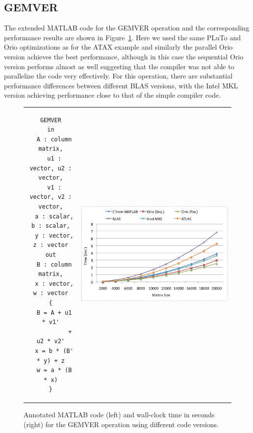 \documentclass[runningheads]{llncs}
\begin{document}
\subsection{GEMVER}


The extended MATLAB code for the GEMVER operation and the corresponding performance results are shown in Figure~\ref{fig:gemver}. Here we used the same PLuTo and Orio optimizations as for the ATAX example and similarly the parallel Orio version achieves the best performance, although in this case the sequential Orio version performs almost as well suggesting that the compiler was not able to parallelize the code very effectively. For this operation, there are substantial performance differences between different BLAS versions, with the Intel MKL version achieving performance close to that of the simple compiler code.
\begin{figure}[htp]
\centering
\begin{tabular}{cc}
\begin{minipage}[b]{.3\textwidth}
\footnotesize
\begin{verbatim}
GEMVER
in
  A : column matrix,
  u1 : vector, u2 : vector,
  v1 : vector, v2 : vector,
  a : scalar, b : scalar,
  y : vector, z : vector
out
  B : column matrix,
  x : vector, w : vector
{
  B = A + u1 * v1'
           + u2 * v2'
  x = b * (B' * y) + z
  w = a * (B * x)
}
\end{verbatim}
\end{minipage}
&
\begin{minipage}[b]{.6\textwidth}
\includegraphics[width=\textwidth]{figures/gemver.png}
\end{minipage}\\
\end{tabular}
\caption{Annotated MATLAB code (left) and wall-clock time in seconds (right) for the GEMVER operation using different code versions.}
\label{fig:gemver}
\end{figure}
\end{document}
